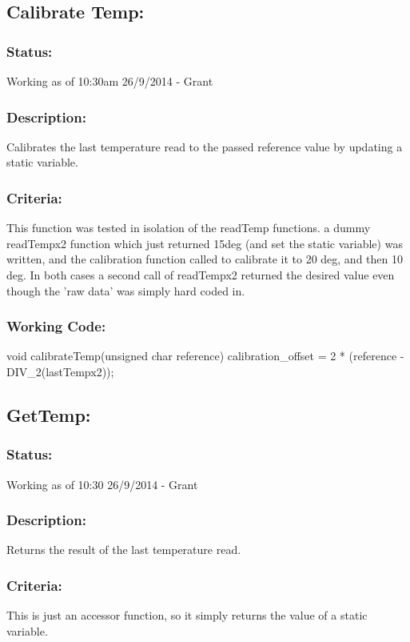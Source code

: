 \documentclass[]{article}
\begin{document}
\subsection{Calibrate Temp:}
\subsubsection{Status:}
Working as of 10:30am 26/9/2014 - Grant

\subsubsection{Description:}
Calibrates the last temperature read to the passed reference value by updating a static variable.

\subsubsection{Criteria:}
This function was tested in isolation of the readTemp functions. a dummy readTempx2 function which just returned 15deg (and set the static variable) was written, and the calibration function called to calibrate it to 20 deg, and then 10 deg. In both cases a second call of readTempx2 returned the desired value even though the 'raw data' was simply hard coded in.

\subsubsection{Working Code:}
void calibrateTemp(unsigned char reference)
{
	calibration\_offset = 2 * (reference - DIV\_2(lastTempx2));
}

\subsection{GetTemp:}

\subsubsection{Status:}
Working as of 10:30 26/9/2014 - Grant

\subsubsection{Description:}
Returns the result of the last temperature read.

\subsubsection{Criteria:}
This is just an accessor function, so it simply returns the value of a static variable.
\end{document}
